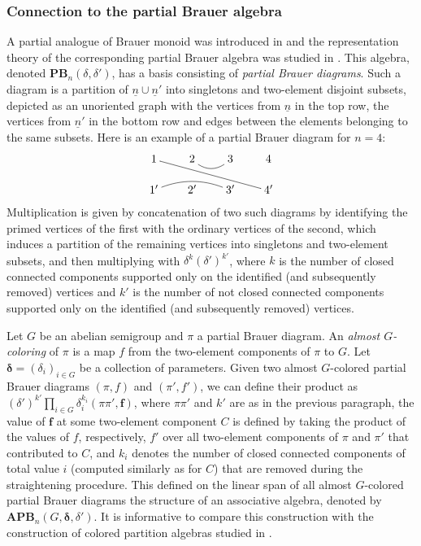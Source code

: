 \documentclass[a4paper]{amsart}
\begin{document}
\subsubsection{Connection to the partial Brauer algebra}\label{s4.4.65}

A partial analogue of Brauer monoid was introduced in \cite{Ma98}
and the representation theory of the corresponding partial
Brauer algebra was studied in \cite{MM14}. This algebra,
denoted $\mathbf{PB}_n(\delta,\delta')$, has a basis consisting of {\em partial 
Brauer diagrams}. Such a diagram is a partition of $\underline{n}\cup\underline{n}'$
into singletons and two-element disjoint subsets, depicted as an unoriented graph
with the vertices from $\underline{n}$ in the top row, 
the vertices from $\underline{n}'$ in the bottom row and  edges 
between the elements belonging to the same subsets. 
Here is an example of a partial Brauer diagram
for $n=4$:
\begin{displaymath}
\xymatrix@R=5mm@C=7mm{
1\ar@{-}[rrrd]&2\ar@/_8pt/@{-}[r]&3&4\\
1'\ar@/^8pt/@{-}[rr]&2'&3'&4'
}
\end{displaymath}
Multiplication is given by concatenation of two such diagrams by identifying
the primed vertices of the first with the ordinary vertices of the second,
which induces a partition of the  remaining vertices into singletons and
two-element subsets, and then multiplying with $\delta^k(\delta')^{k'}$,
where $k$ is the number of closed connected components supported 
only on the identified (and subsequently removed) vertices
and $k'$ is the number of not closed connected components supported 
only on the identified (and subsequently removed) vertices.

Let $G$ be an abelian semigroup and $\pi$ a partial Brauer diagram. 
An {\em almost $G$-coloring} of $\pi$ is a map $f$ from the two-element
components of $\pi$ to $G$. Let $\boldsymbol{\delta}=(\delta_i)_{i\in G}$
be a collection of parameters. Given two almost $G$-colored partial
Brauer diagrams $(\pi,f)$ and $(\pi',f')$, we can define their product
as $\displaystyle (\delta')^{k'}\prod_{i\in G}\delta_i^{k_i}(\pi\pi',\mathbf{f})$, where
$\pi\pi'$ and $k'$ are as in the previous paragraph,
the value of $\mathbf{f}$ at some two-element component $C$ is defined
by taking the product of the values of $f$, respectively, $f'$ over
all two-element components of $\pi$ and $\pi'$ that contributed to $C$,
and $k_i$ denotes the number of closed connected components
of total value $i$ (computed similarly as for $C$) that are removed during the
straightening procedure.
This defined on the linear span of all almost $G$-colored partial Brauer diagrams 
the structure of an associative algebra, denoted by 
$\mathbf{APB}_n(G,\boldsymbol{\delta},\delta')$. 
It is informative to compare this  construction with the construction of 
colored partition algebras studied in \cite{MaSr22}.
\end{document}
